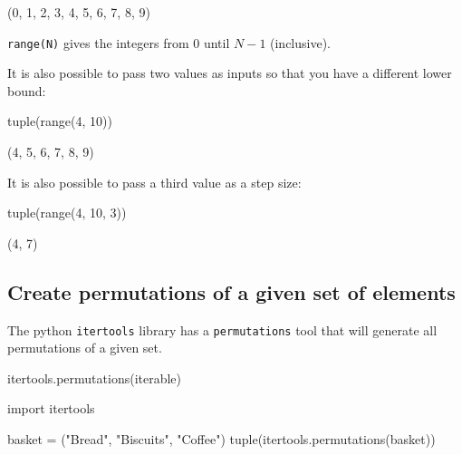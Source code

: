 \begin{raw}
(0, 1, 2, 3, 4, 5, 6, 7, 8, 9)
\end{raw}






\texttt{range(N)} gives the integers from 0 until \(N - 1\) (inclusive).



It is also possible to pass two values as inputs so that you have a different lower bound:




\begin{api}
tuple(range(4, 10))
\end{api}





\begin{raw}
(4, 5, 6, 7, 8, 9)
\end{raw}





It is also possible to pass a third value as a step size:




\begin{pyin}
tuple(range(4, 10, 3))
\end{pyin}





\begin{raw}
(4, 7)
\end{raw}





\subsection{Create permutations of a given set of elements}
\label{\detokenize{tools-for-mathematics/05-combinations-permutations/how/main:creating-permutations-of-a-given-set-of-elements}}

The python \texttt{itertools} library has a \texttt{permutations} tool that will generate all
permutations of a given set.


\begin{api}
itertools.permutations(iterable)
\end{api}





\begin{pyin}
import itertools

basket = ("Bread", "Biscuits", "Coffee")
tuple(itertools.permutations(basket))
\end{pyin}





